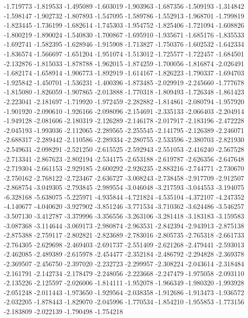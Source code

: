 -1.719773
-1.819533
-1.495089
-1.603019
-1.903963
-1.687356
-1.509193
-1.314842
-1.598147
-1.902732
-1.807893
-1.547095
-1.589786
-1.552913
-1.968701
-1.799819
-1.823445
-1.736199
-1.682614
-1.745303
-1.954752
-1.825406
-1.721094
-1.608826
-1.800219
-1.890024
-1.540830
-1.700867
-1.695910
-1.935671
-1.685176
-1.835533
-1.692741
-1.582395
-1.628946
-1.915908
-1.713827
-1.750376
-1.602532
-1.642334
-1.836574
-1.566697
-1.651204
-1.951074
-1.513012
-1.725577
-1.722457
-1.684501
-2.132876
-1.815033
-1.878788
-1.962015
-1.874259
-1.700056
-1.816874
-2.026491
-1.682174
-1.658914
-1.906773
-1.892919
-1.614167
-1.826223
-1.790337
-1.694703
-1.925842
-1.450701
-1.536231
-1.400396
-1.873485
-2.029919
-2.245660
-1.777678
-1.815080
-1.826059
-1.907865
-2.013888
-1.770318
-1.809493
-1.726348
-1.861423
-2.223041
-2.181697
-1.719920
-1.972459
-2.282882
-1.814861
-2.080794
-1.957920
-1.901920
-2.090610
-1.926166
-2.098096
-2.154691
-2.335133
-2.066403
-2.204914
-1.949128
-2.081606
-2.180319
-2.126289
-2.146178
-2.017917
-2.183196
-2.472228
-2.045193
-1.993036
-2.112065
-2.289565
-2.255545
-2.141795
-2.126389
-2.246071
-2.688317
-2.289442
-2.110586
-2.289334
-2.280755
-2.533596
-2.380703
-2.821930
-2.549631
-2.098291
-2.521250
-2.615525
-2.592943
-2.551053
-2.416240
-2.567528
-2.713341
-2.867623
-2.802194
-2.534175
-2.653188
-2.619787
-2.626356
-2.647648
-2.719304
-2.661153
-2.929185
-2.600292
-2.926235
-2.883216
-2.744771
-2.730670
-2.750162
-2.768122
-2.723467
-2.636727
-3.008243
-2.738458
-2.917709
-2.912507
-2.868754
-3.049305
-2.793845
-2.989554
-3.046048
-3.217593
-3.044553
-3.194075
-6.328168
-5.638075
-5.225971
-4.935844
-4.721824
-4.535104
-4.372107
-4.247352
-4.140677
-4.040620
-3.927902
-3.851246
-3.771534
-3.710362
-3.624486
-3.546257
-3.507130
-3.412787
-3.379996
-3.356556
-3.263106
-3.281418
-3.183183
-3.159583
-3.087368
-3.114644
-3.069173
-2.980874
-2.963531
-2.842394
-2.943913
-2.875138
-2.875388
-2.759117
-2.802821
-2.823689
-2.783016
-2.805735
-2.765318
-2.661733
-2.764305
-2.629698
-2.469403
-2.691737
-2.551409
-2.621268
-2.479441
-2.593013
-2.462085
-2.489389
-2.615978
-2.454477
-2.352184
-2.486792
-2.294828
-2.369378
-2.369507
-2.456750
-2.397020
-2.232723
-2.299957
-2.308224
-2.043614
-2.318484
-2.161791
-2.142734
-2.178479
-2.248056
-2.223668
-2.247479
-1.975058
-2.093110
-2.135226
-2.125597
-2.026006
-1.814111
-1.952078
-1.966349
-1.980320
-1.993928
-2.051248
-2.011443
-1.973650
-1.929564
-2.038358
-1.912686
-1.913473
-1.936572
-2.032205
-1.878443
-1.829070
-2.045996
-1.770534
-1.854210
-1.955853
-1.773156
-2.183809
-2.022139
-1.790498
-1.754218
